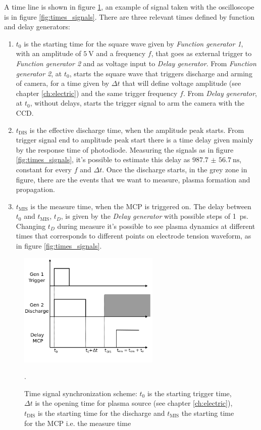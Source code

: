 A time line is shown in figure \ref{fig:times}, an example of signal taken with the oscilloscope is in figure \ref{fig:times_signals}. There are three relevant times defined by function and delay generators:
\begin{enumerate}
 \item $t_{0}$ is the starting time for the square wave given by \emph{Function generator 1}, with an amplitude of $\SI{5}{\volt}$ and a frequency $f$, that goes as external trigger to \emph{Function generator 2} and as voltage input to \emph{Delay generator}. From \emph{Function generator 2}, at $t_{0}$, starts the square wave that triggers discharge and arming of camera, for a time given by $\Delta t$ that will define voltage amplitude (see chapter \ref{ch:electric}) and the same trigger frequency $f$. From \emph{Delay generator}, at $t_{0}$, without delays, starts the trigger signal to arm the camera with the CCD.
 \item $t_{\text{DIS}}$ is the effective discharge time, when the amplitude peak starts. From trigger signal end to amplitude peak start there is a time delay given mainly by the response time of photodiode. Measuring the signals as in figure \ref{fig:times_signals}, it's possible to estimate this delay as $\SI{987.7(567)}{\nano\second}$, constant for every $f$ and $\Delta t$. Once the discharge starts, in the grey zone in figure, there are the events that we want to measure, plasma formation and propagation.
 \item $t_{\text{MIS}}$ is the measure time, when the MCP is triggered on. The delay between $t_{0}$ and $t_{\text{MIS}}$, $t_{D}$, is given by the \emph{Delay generator} with possible steps of \SI{1}{\pico\second}. Changing $t_{D}$ during measure it's possible to see plasma dynamics at different times that corresponds to different points on electrode tension waveform, as in figure \ref{fig:times_signals}.
\end{enumerate}
\begin{figure}
 \centering
 \includegraphics[width=0.6\textwidth]{Images/Shape/times.png}
 \caption{Time signal synchronization scheme: $t_{0}$ is the starting trigger time, $\Delta t$ is the opening time for plasma source (see chapter \ref{ch:electric}), $t_{\text{DIS}}$ is the starting time for the discharge and $t_{\text{MIS}}$ the starting time for the MCP i.e. the measure time}.
 \label{fig:times}
\end{figure}

